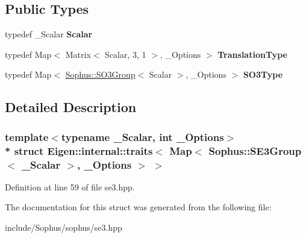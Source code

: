 \subsection*{Public Types}
\begin{DoxyCompactItemize}
\item 
typedef \+\_\+\+Scalar {\bfseries Scalar}\hypertarget{struct_eigen_1_1internal_1_1traits_3_01_map_3_01_sophus_1_1_s_e3_group_3_01___scalar_01_4_00_01___options_01_4_01_4_a00a43c378601d006c2b1200a303289a1}{}\label{struct_eigen_1_1internal_1_1traits_3_01_map_3_01_sophus_1_1_s_e3_group_3_01___scalar_01_4_00_01___options_01_4_01_4_a00a43c378601d006c2b1200a303289a1}

\item 
typedef Map$<$ Matrix$<$ Scalar, 3, 1 $>$, \+\_\+\+Options $>$ {\bfseries Translation\+Type}\hypertarget{struct_eigen_1_1internal_1_1traits_3_01_map_3_01_sophus_1_1_s_e3_group_3_01___scalar_01_4_00_01___options_01_4_01_4_a0b153a0b93d8eb3299e3958e2ce5c938}{}\label{struct_eigen_1_1internal_1_1traits_3_01_map_3_01_sophus_1_1_s_e3_group_3_01___scalar_01_4_00_01___options_01_4_01_4_a0b153a0b93d8eb3299e3958e2ce5c938}

\item 
typedef Map$<$ \hyperlink{class_sophus_1_1_s_o3_group}{Sophus\+::\+S\+O3\+Group}$<$ Scalar $>$, \+\_\+\+Options $>$ {\bfseries S\+O3\+Type}\hypertarget{struct_eigen_1_1internal_1_1traits_3_01_map_3_01_sophus_1_1_s_e3_group_3_01___scalar_01_4_00_01___options_01_4_01_4_a85702dd0a64aa4c2db7b7c04f007648b}{}\label{struct_eigen_1_1internal_1_1traits_3_01_map_3_01_sophus_1_1_s_e3_group_3_01___scalar_01_4_00_01___options_01_4_01_4_a85702dd0a64aa4c2db7b7c04f007648b}

\end{DoxyCompactItemize}


\subsection{Detailed Description}
\subsubsection*{template$<$typename \+\_\+\+Scalar, int \+\_\+\+Options$>$\\*
struct Eigen\+::internal\+::traits$<$ Map$<$ Sophus\+::\+S\+E3\+Group$<$ \+\_\+\+Scalar $>$, \+\_\+\+Options $>$ $>$}



Definition at line 59 of file se3.\+hpp.



The documentation for this struct was generated from the following file\+:\begin{DoxyCompactItemize}
\item 
include/\+Sophus/sophus/se3.\+hpp\end{DoxyCompactItemize}
